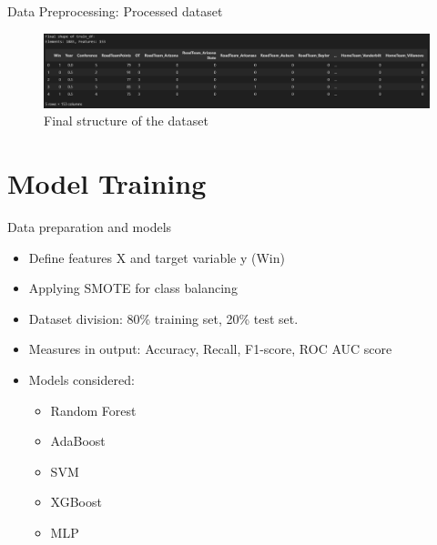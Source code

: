 \documentclass{beamer}
\begin{document}
\begin{frame}{Data Preprocessing: Processed dataset}
    \begin{figure}
        \centering
        \includegraphics[width=0.9\linewidth]{images/final_dataset.png}
        \caption{Final structure of the dataset}
        \label{fig:enter-label}
    \end{figure}
\end{frame}

\section{Model Training}
\begin{frame}{Data preparation and models}
    \begin{itemize}
        \item Define features X and target variable y (Win)
        \item Applying SMOTE for class balancing
        \item Dataset division: 80\% training set, 20\% test set.
        \item Measures in output: Accuracy, Recall, F1-score, ROC AUC score
        \item Models considered:
            \begin{itemize}
                \item Random Forest
                \item AdaBoost
                \item SVM
                \item XGBoost
                \item MLP
            \end{itemize}
    \end{itemize}
\end{frame}
\end{document}
